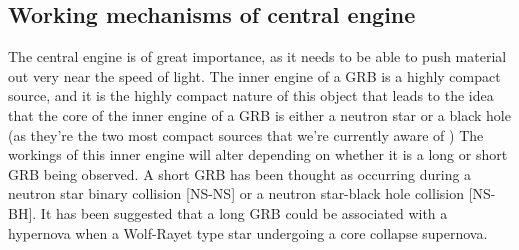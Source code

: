 \subsection{Working mechanisms of central engine}
The central  engine is of great importance, as it needs to be able to push material out very near the speed of light. The inner engine of a GRB is a highly compact source, and it is the highly compact nature of this object that leads to the idea that the core of the inner engine of a GRB is either a neutron star or a black hole (as they're the two most compact sources that we're currently aware of )
The workings of this inner engine will alter depending on whether it is a long or short GRB being observed. A short GRB has been thought as occurring during a neutron star binary collision [NS-NS] or a neutron star-black hole collision [NS-BH]. It has been suggested that a long GRB could be associated with a hypernova when  a Wolf-Rayet type star undergoing a core collapse supernova.\citep{21}\citep{23}
